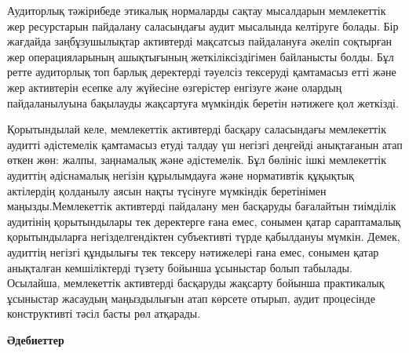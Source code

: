 \begin{multicols}{2}
Аудиторлық тәжірибеде этикалық нормаларды сақтау мысалдарын мемлекеттік
жер ресурстарын пайдалану саласындағы аудит мысалында келтіруге болады.
Бір жағдайда заңбұзушылықтар активтерді мақсатсыз пайдалануға әкеліп
соқтырған жер операцияларының ашықтығының жеткіліксіздігімен байланысты
болды. Бұл ретте аудиторлық топ барлық деректерді тәуелсіз тексеруді
қамтамасыз етті және жер активтерін есепке алу жүйесіне өзгерістер
енгізуге және олардың пайдаланылуына бақылауды жақсартуға мүмкіндік
беретін нәтижеге қол жеткізді.

Қорытындылай келе, мемлекеттік активтерді басқару саласындағы
мемлекеттік аудитті әдістемелік қамтамасыз етуді талдау үш негізгі
деңгейді анықтағанын атап өткен жөн: жалпы, заңнамалық және әдістемелік.
Бұл бөлініс ішкі мемлекеттік аудиттің әдіснамалық негізін құрылымдауға
және нормативтік құқықтық актілердің қолданылу аясын нақты түсінуге
мүмкіндік беретінімен маңызды.Мемлекеттік активтерді пайдалану мен
басқаруды бағалайтын тиімділік аудитінің қорытындылары тек деректерге
ғана емес, сонымен қатар сараптамалық қорытындыларға негізделгендіктен
субъективті түрде қабылдануы мүмкін. Демек, аудиттің негізгі құндылығы
тек тексеру нәтижелері ғана емес, сонымен қатар анықталған кемшіліктерді
түзету бойынша ұсыныстар болып табылады. Осылайша, мемлекеттік
активтерді басқаруды жақсарту бойынша практикалық ұсыныстар жасаудың
маңыздылығын атап көрсете отырып, аудит процесінде конструктивті тәсіл
басты рөл атқарады.
\end{multicols}

\begin{center}
{\bfseries Әдебиеттер}
\end{center}

